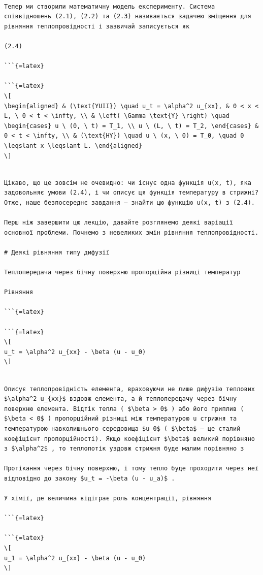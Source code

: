 \documentclass[
]{article}
\begin{document}
\begin{verbatim}

Тепер ми створили математичну модель експерименту. Система співвідношень (2.1), (2.2) та (2.3) називається задачею зміщення для рівняння теплопровідності і зазвичай записується як

(2.4)

```{=latex}

```{=latex}
\[
\begin{aligned} & (\text{YUII}) \quad u_t = \alpha^2 u_{xx}, & 0 < x < L, \ 0 < t < \infty, \\ & \left( \Gamma \text{Y} \right) \quad \begin{cases} u \ (0, \ t) = T_1, \\ u \ (L, \ t) = T_2, \end{cases} & 0 < t < \infty, \\ & (\text{HY}) \quad u \ (x, \ 0) = T_0, \quad 0 \leqslant x \leqslant L. \end{aligned}
\]
\end{verbatim}

\begin{verbatim}

Цікаво, що це зовсім не очевидно: чи існує одна функція u(x, t), яка задовольняє умови (2.4), і чи описує ця функція температуру в стрижні? Отже, наше безпосереднє завдання — знайти цю функцію u(x, t) з (2.4).

Перш ніж завершити цю лекцію, давайте розглянемо деякі варіації основної проблеми. Почнемо з невеликих змін рівняння теплопровідності.

# Деякі рівняння типу дифузії

Теплопередача через бічну поверхню пропорційна різниці температур

Рівняння

```{=latex}

```{=latex}
\[
u_t = \alpha^2 u_{xx} - \beta (u - u_0)
\]
\end{verbatim}

\begin{verbatim}

Описує теплопровідність елемента, враховуючи не лише дифузію теплових $\alpha^2 u_{xx}$ вздовж елемента, а й теплопередачу через бічну поверхню елемента. Відтік тепла ( $\beta > 0$ ) або його приплив ( $\beta < 0$ ) пропорційний різниці між температурою u стрижня та температурою навколишнього середовища $u_0$ ( $\beta$ — це сталий коефіцієнт пропорційності). Якщо коефіцієнт $\beta$ великий порівняно з $\alpha^2$ , то теплопотік уздовж стрижня буде малим порівняно з

Протікання через бічну поверхню, і тому тепло буде проходити через неї відповідно до закону $u_t = -\beta (u - u_a)$ .

У хімії, де величина відіграє роль концентрації, рівняння

```{=latex}

```{=latex}
\[
u_1 = \alpha^2 u_{xx} - \beta (u - u_0)
\]
\end{verbatim}
\end{document}
